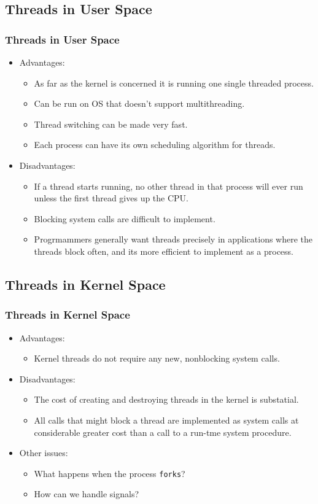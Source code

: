 \documentclass{beamer}
\begin{document}
\subsection{Threads in User Space}
\begin{frame}
\frametitle{Threads in User Space}
\begin{itemize}
\item Advantages:
\begin{itemize}
\item As far as the kernel is concerned it is running one single threaded process.
\item Can be run on OS that doesn't support multithreading.
\item Thread switching can be made very fast.
\item Each process can have its own scheduling algorithm for threads.
\end{itemize}
\item Disadvantages:
\begin{itemize}
\item If a thread starts running, no other thread in that process will ever run unless the first thread gives up the CPU.
\item Blocking system calls are difficult to implement.
\item Progrmammers generally want threads precisely in applications where the threads block often, and its more efficient to implement as a process.
\end{itemize}
\end{itemize}
\end{frame}
\subsection{Threads in Kernel Space}
\begin{frame}
\frametitle{Threads in Kernel Space}
\begin{itemize}
\item Advantages:
\begin{itemize}
\item Kernel threads do not require any new, nonblocking system calls.
\end{itemize}
\item Disadvantages:
\begin{itemize}
\item The cost of creating and destroying threads in the kernel is substatial.
\item All calls that might block a thread are implemented as system calls at considerable greater cost than a call to a run-tme system procedure.
\end{itemize}
\item Other issues:
\begin{itemize}
\item What happens when the process \texttt{forks}?
\item How can we handle signals?
\end{itemize}
\end{itemize}
\end{frame}
\end{document}
